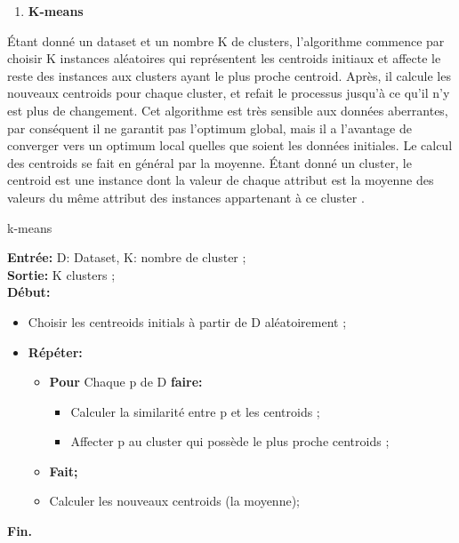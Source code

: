 \begin{enumerate}[nosep,label=\textbf{\arabic*)}]
	\item \textbf{K-means}
\end{enumerate}\mbox{}\indent Étant donné un dataset et un nombre K de clusters, l’algorithme commence par choisir K instances aléatoires qui représentent les centroids initiaux et affecte le reste des instances aux clusters ayant le plus proche centroid. Après, il calcule les nouveaux centroids pour chaque cluster, et refait le processus jusqu'à ce qu'il n'y est plus de changement.
Cet algorithme est très sensible aux données aberrantes, par conséquent il ne garantit pas l’optimum global, mais il a l'avantage de converger vers un optimum local quelles que soient les données initiales.
Le calcul des centroids se fait en général par la moyenne. Étant donné un cluster, le centroid est une instance dont la valeur de chaque attribut est la moyenne des valeurs du même attribut des instances appartenant à ce cluster \cite{ref33}.
 \begin{algorithm}[H]
	\caption{k-means}
	\hspace*{\algorithmicindent} \textbf{Entrée:} D: Dataset, K: nombre de cluster ;\\
	\hspace*{\algorithmicindent} \textbf{Sortie:} K clusters ; \\
	\hspace*{\algorithmicindent}\textbf{ Début:}
	\begin{itemize}
		\item [] Choisir les centreoids initials à partir de D aléatoirement ;
		
		\item []\textbf{Répéter:}
		\begin{itemize}
			\item []\textbf{Pour} Chaque p de D \textbf{faire:} 
			\begin{itemize}
				\item [] Calculer la similarité entre p et les centroids  ;
				\item [] Affecter p au cluster qui possède le plus proche centroids ;
			\end{itemize}
			\item []\textbf{Fait;}
			\item [] Calculer les nouveaux centroids (la moyenne);
		\end{itemize}
	\end{itemize}
	\hspace*{\algorithmicindent}\textbf{ Fin.}
\end{algorithm} 
\mbox{}\\

